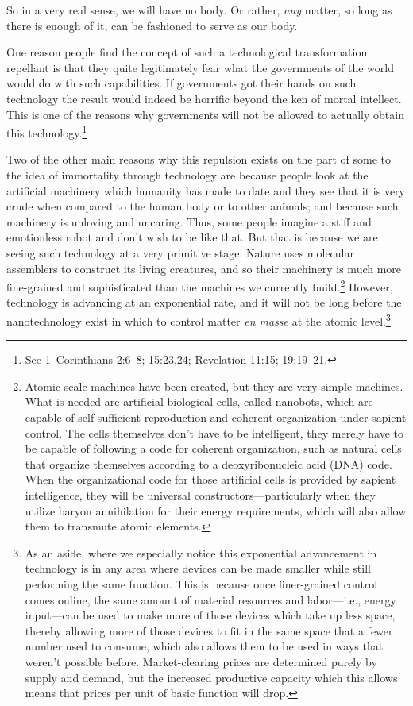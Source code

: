 \documentclass[letterpaper,12pt]{article}
\begin{document}
So in a very real sense, we will have no body. Or rather, \emph{any} matter, so long as there is enough of it, can be fashioned to serve as our body.

One reason people find the concept of such a technological transformation repellant is that they quite legitimately fear what the governments of the world would do with such capabilities. If governments got their hands on such technology the result would indeed be horrific beyond the ken of mortal intellect. This is one of the reasons why governments will not be allowed to actually obtain this technology.\footnote{See 1~Corinthians 2:6--8; 15:23,24; Revelation 11:15; 19:19--21.}

Two of the other main reasons why this repulsion exists on the part of some to the idea of immortality through technology are because people look at the artificial machinery which humanity has made to date and they see that it is very crude when compared to the human body or to other animals; and because such machinery is unloving and uncaring. Thus, some people imagine a stiff and emotionless robot and don't wish to be like that. But that is because we are seeing such technology at a very primitive stage. Nature uses molecular assemblers to construct its living creatures, and so their machinery is much more fine-grained and sophisticated than the machines we currently build.\footnote{Atomic-scale machines have been created, but they are very simple machines. What is needed are artificial biological cells, called nanobots, which are capable of self-sufficient reproduction and coherent organization under sapient control. The cells themselves don't have to be intelligent, they merely have to be capable of following a code for coherent organization, such as natural cells that organize themselves according to a deoxyribonucleic acid (DNA) code. When the organizational code for those artificial cells is provided by sapient intelligence, they will be universal constructors---particularly when they utilize baryon annihilation for their energy requirements, which will also allow them to transmute atomic elements.} However, technology is advancing at an exponential rate, and it will not be long before the nanotechnology exist in which to control matter \emph{en masse} at the atomic level.\footnote{As an aside, where we especially notice this exponential advancement in technology is in any area where devices can be made smaller while still performing the same function. This is because once finer-grained control comes online, the same amount of material resources and labor---i.e., energy input---can be used to make more of those devices which take up less space, thereby allowing more of those devices to fit in the same space that a fewer number used to consume, which also allows them to be used in ways that weren't possible before. Market-clearing prices are determined purely by supply and demand, but the increased productive capacity which this allows means that prices per unit of basic function will drop.\par
}
\end{document}
